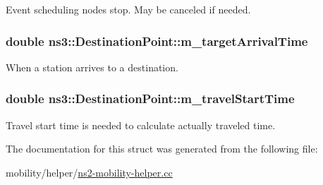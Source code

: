 Event scheduling node\textquotesingle{}s stop. May be canceled if needed. 

\subsubsection[{\texorpdfstring{m\+\_\+target\+Arrival\+Time}{m_targetArrivalTime}}]{\setlength{\rightskip}{0pt plus 5cm}double ns3\+::\+Destination\+Point\+::m\+\_\+target\+Arrival\+Time}\hypertarget{structns3_1_1DestinationPoint_a62ce9a8957e676a74f878ec180f17d0d}{}\label{structns3_1_1DestinationPoint_a62ce9a8957e676a74f878ec180f17d0d}


When a station arrives to a destination. 

\subsubsection[{\texorpdfstring{m\+\_\+travel\+Start\+Time}{m_travelStartTime}}]{\setlength{\rightskip}{0pt plus 5cm}double ns3\+::\+Destination\+Point\+::m\+\_\+travel\+Start\+Time}\hypertarget{structns3_1_1DestinationPoint_a27a703034585331d143ab2c5e28f8072}{}\label{structns3_1_1DestinationPoint_a27a703034585331d143ab2c5e28f8072}


Travel start time is needed to calculate actually traveled time. 



The documentation for this struct was generated from the following file\+:\begin{DoxyCompactItemize}
\item 
mobility/helper/\hyperlink{ns2-mobility-helper_8cc}{ns2-\/mobility-\/helper.\+cc}\end{DoxyCompactItemize}
